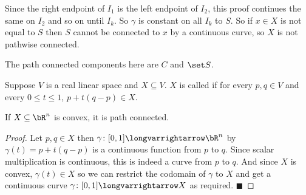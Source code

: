 \documentclass[10pt]{article}
\def\qed{\hskip1cm\penalty-100\hbox{}\hfill$\blacksquare$}
\def\longto{\longvarrightarrow}
\begin{document}
\begin{exam*}
    Since the right endpoint of $I_1$ is the left endpoint of $I_2$, this proof continues the same on $I_2$ and so on until $I_k$.
    So $\gamma$ is constant on all $I_k$ to $S$.
    So if $x\in X$ is not equal to $S$ then $S$ cannot be connected to $x$ by a continuous curve, so $X$ is not pathwise connected.

    The path connected components here are $C$ and $\set S$.

\end{exam*}

\begin{defn*}

    Suppose $V$ is a real linear space and $X\subseteq V$.
    $X$ is called  if for every $p,q\in V$ and every $0\leq t\leq1$, $p+t(q-p)\in X$.

\end{defn*}

\begin{prop*}

    If $X\subseteq\bR^n$ is convex, it is path connected.

\end{prop*}

\begin{proof}

    Let $p,q\in X$ then $\gamma\colon[0,1]\longto\bR^n$ by $\gamma(t)=p+t(q-p)$ is a continuous function from $p$ to $q$.
    Since scalar multiplication is continuous, this is indeed a curve from $p$ to $q$.
    And since $X$ is convex, $\gamma(t)\in X$ so we can restrict the codomain of $\gamma$ to $X$ and get a continuous curve $\gamma\colon[0,1]\longto X$ as required.
    \qed

\end{proof}
\end{document}
